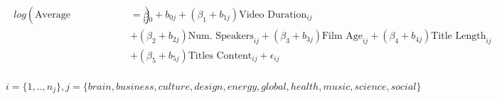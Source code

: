 \begin{align}
\begin{split}
log(\text{Average Num.Views/Day}_{ij})&=\beta_0+b_{0j}+(\beta_1+b_{1j})\text{Video Duration}_{ij}\\
&+(\beta_2+b_{2j})\text{Num. Speakers}_{ij}+(\beta_3+b_{3j})\text{Film Age}_{ij}+(\beta_4+b_{4j})\text{Title Length}_{ij}\\
&+(\beta_5+b_{5j})\text{Titles Content}_{ij}+\epsilon_{ij}\\
\end{split}
\label{poisson_mixed_themes_eqn}
\end{align}

\begin{equation*}
i=\{1,..,n_j\}, j=\{brain, business, culture, design, energy, global, health, music, science, social\}
\end{equation*}